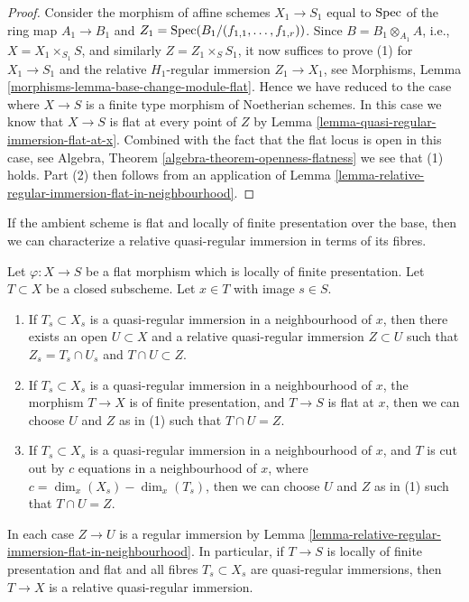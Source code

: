 \begin{proof}
\medskip\noindent
Consider the morphism of affine schemes
$X_1 \to S_1$ equal to $\mathop{\mathrm{Spec}}$ of the
ring map $A_1 \to B_1$ and
$Z_1 = \mathop{\mathrm{Spec}}(B_1/(f_{1, 1}, \ldots, f_{1, r}))$.
Since $B = B_1 \otimes_{A_1} A$, i.e., $X = X_1 \times_{S_1} S$,
and similarly $Z = Z_1 \times_S S_1$,
it now suffices to prove (1) for $X_1 \to S_1$ and the relative
$H_1$-regular immersion $Z_1 \to X_1$, see
Morphisms, Lemma \ref{morphisms-lemma-base-change-module-flat}.
Hence we have reduced to the case where $X \to S$ is a finite type
morphism of Noetherian schemes.
In this case we know that $X \to S$ is flat at every
point of $Z$ by
Lemma \ref{lemma-quasi-regular-immersion-flat-at-x}.
Combined with the fact that the flat locus is open in this case, see
Algebra, Theorem \ref{algebra-theorem-openness-flatness}
we see that (1) holds. Part (2) then follows from an application of
Lemma \ref{lemma-relative-regular-immersion-flat-in-neighbourhood}.
\end{proof}

\noindent
If the ambient scheme is flat and locally of finite presentation over
the base, then we can characterize a relative
quasi-regular immersion in terms of its fibres.

\begin{lemma}
\label{lemma-fibre-quasi-regular}
Let $\varphi : X \to S$ be a flat morphism which is locally of finite
presentation. Let $T \subset X$ be a closed subscheme.
Let $x \in T$ with image $s \in S$.
\begin{enumerate}
\item If $T_s \subset X_s$ is a quasi-regular immersion
in a neighbourhood of $x$, then there exists an open
$U \subset X$ and a relative quasi-regular immersion
$Z \subset U$ such that $Z_s = T_s \cap U_s$ and $T \cap U \subset Z$.
\item If $T_s \subset X_s$ is a quasi-regular immersion
in a neighbourhood of $x$, the morphism $T \to X$ is of finite
presentation, and $T \to S$ is flat at $x$, then we can choose $U$ and
$Z$ as in (1) such that $T \cap U = Z$.
\item If $T_s \subset X_s$ is a quasi-regular immersion in a neighbourhood
of $x$, and $T$ is cut out by $c$ equations in a neighbourhood of $x$,
where $c = \dim_x(X_s) - \dim_x(T_s)$, then we can choose $U$ and $Z$ as in (1)
such that $T \cap U = Z$.
\end{enumerate}
In each case $Z \to U$ is a regular immersion by
Lemma \ref{lemma-relative-regular-immersion-flat-in-neighbourhood}.
In particular, if $T \to S$ is locally of finite presentation and flat and
all fibres $T_s \subset X_s$ are quasi-regular immersions, then
$T \to X$ is a relative quasi-regular immersion.
\end{lemma}

